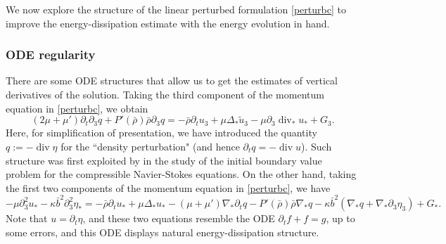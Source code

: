 \documentclass[a4paper,reqno,11pt]{amsart}
\numberwithin{equation}{section}
\begin{document}
We now explore the structure of the linear perturbed formulation \eqref{perturbc} to improve the energy-dissipation estimate with the energy evolution in hand.

\subsubsection{ODE regularity}

There are some ODE structures that allow us to get the estimates of vertical derivatives of the solution. Taking the third component of the momentum equation in \eqref{perturbc}, we obtain
\begin{equation}\label{qode}
 (2\mu+\mu'){\partial_t} {\partial}_3 q +P '(\bar{\rho} )\bar\rho {\partial}_3 q
 =  - \bar \rho\partial_t u_3 +\mu\Delta_\ast \tilde{u}_3-\mu{\partial}_3\operatorname{div}_\ast u_\ast+G_3.
\end{equation}
Here, for simplification of presentation, we have introduced the quantity $q:=-\operatorname{div} \eta$ for the ``density perturbation" (and hence ${\partial_t} q=-\operatorname{div} u$). Such structure was first exploited by \cite{MN83} in the study of the initial boundary value problem for the compressible Navier-Stokes equations. On the other hand, taking the first two components of the momentum equation in \eqref{perturbc}, we have
\begin{equation}\label{etaode}
 -\mu{\partial}_3^2  {u}_\ast-\kappa\bar b^2 {\partial}_3^2  \eta_\ast
= -\bar \rho\partial_t u_\ast +\mu\Delta_\ast u_\ast  -(\mu+\mu')\nabla_\ast {\partial_t} q - P '(\bar{\rho} )\bar\rho \nabla_\ast q-\kappa\bar b^2\left( \nabla_\ast q+ \nabla_\ast {\partial}_3\eta_3\right)+G_\ast .
\end{equation}
Note that $u={\partial_t} \eta$, and these two equations resemble the ODE ${\partial_t} f + f= g$, up to some errors, and this ODE displays natural energy-dissipation structure.
\end{document}
